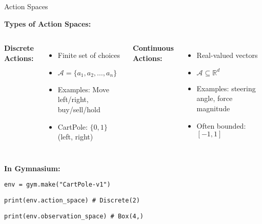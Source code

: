 \documentclass[aspectratio=169,10pt]{beamer}
\begin{document}
\begin{frame}{Action Spaces}

\textbf{Types of Action Spaces:}

\vfill

\begin{columns}[t]
\textbf{Discrete Actions:}
\begin{itemize}
    \item Finite set of choices
    \item $\mathcal{A} = \{a_1, a_2, \ldots, a_n\}$
    \item Examples: Move left/right, buy/sell/hold
    \item CartPole: $\{0, 1\}$ (left, right)
\end{itemize}

\textbf{Continuous Actions:}
\begin{itemize}
    \item Real-valued vectors
    \item $\mathcal{A} \subseteq \mathbb{R}^d$
    \item Examples: steering angle, force magnitude
    \item Often bounded: $[-1, 1]$
\end{itemize}
\end{columns}

\vfill

\textbf{In Gymnasium:}

\texttt{env = gym.make("CartPole-v1")}

\texttt{print(env.action\_space)  \# Discrete(2)}

\texttt{print(env.observation\_space)  \# Box(4,)}

\end{frame}
\end{document}
